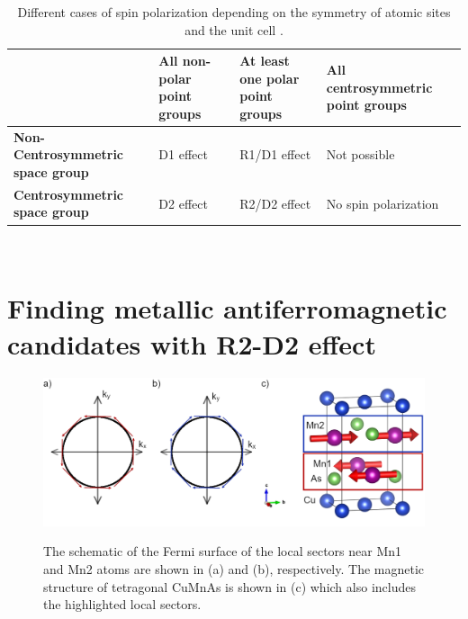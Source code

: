 \documentclass[10pt,doublespacing,edeposit]{uiucthesis2020}
\begin{document}
\begin{mainmatter}
\renewcommand{\arraystretch}{1.2}
\begin{table}
\caption{\label{tab:RD_effect} 
Different cases of spin polarization depending on the symmetry of atomic sites and the unit cell \cite{Zhang2014}.}
\centering
\begin{tabular}{>{\raggedright\arraybackslash}p{5cm}>{\raggedright\arraybackslash}p{3cm}>{\raggedright\arraybackslash}p{3cm}>{\raggedright\arraybackslash}p{3cm}}
\hline\hline
\textbf{} & \textbf{All non-polar point groups} & \textbf{At least one polar point groups} & \textbf{All centrosymmetric point groups}\\
\hline
\textbf{Non-Centrosymmetric space group} & D1 effect & R1/D1 effect & Not possible\\
\hline
\textbf{Centrosymmetric space group} & D2 effect & R2/D2 effect & No spin polarization\\
\hline\hline
\end{tabular}
~\\
\end{table}

\section{Finding metallic antiferromagnetic candidates with R2-D2 effect}

\begin{figure}
\centering\includegraphics[width=\columnwidth]{figures/ch2/wadley_1.png} \\
\caption{\label{fig:wadley_1}
The schematic of the Fermi surface of the local sectors near Mn1 and Mn2 atoms are shown in (a) and (b), respectively. The magnetic structure of tetragonal CuMnAs is shown in (c) which also includes the highlighted local sectors.
}
\end{figure}



\end{mainmatter}
\end{document}
